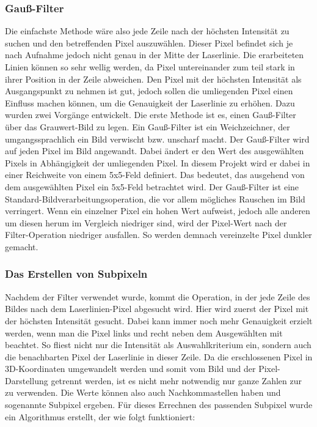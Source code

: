 	\subsubsection{Gauß-Filter}
	Die einfachste Methode wäre also jede Zeile nach der höchsten Intensität zu suchen und den betreffenden Pixel auszuwählen. Dieser Pixel befindet sich je nach Aufnahme jedoch nicht genau in der Mitte der Laserlinie. Die erarbeiteten Linien können so sehr \glqq wellig\grqq{} werden, da Pixel untereinander zum teil stark in ihrer Position in der Zeile abweichen. Den Pixel mit der höchsten Intensität als Ausgangspunkt zu nehmen ist gut, jedoch sollen die umliegenden Pixel einen Einfluss machen können, um die Genauigkeit der Laserlinie zu erhöhen. Dazu wurden zwei Vorgänge entwickelt. \newline
	Die erste Methode ist es, einen Gauß-Filter über das Grauwert-Bild zu legen. Ein Gauß-Filter ist ein Weichzeichner, der umgangssprachlich ein Bild verwischt bzw. unscharf macht. Der Gauß-Filter wird auf jeden Pixel im Bild angewandt. Dabei ändert er den Wert des ausgewählten Pixels in Abhängigkeit der umliegenden Pixel. In diesem Projekt wird er dabei in einer Reichweite von einem 5x5-Feld definiert. Das bedeutet, das ausgehend von dem ausgewählten Pixel ein 5x5-Feld betrachtet wird. Der Gauß-Filter ist eine Standard-Bildverarbeitungsoperation, die vor allem mögliches Rauschen im Bild verringert. Wenn ein einzelner Pixel ein hohen Wert aufweist, jedoch alle anderen um diesen herum im Vergleich niedriger sind, wird der Pixel-Wert nach der Filter-Operation niedriger ausfallen. So werden demnach vereinzelte Pixel dunkler gemacht.
	
	\subsubsection{Das Erstellen von Subpixeln}
	Nachdem der Filter verwendet wurde, kommt die Operation, in der jede Zeile des Bildes nach dem Laserlinien-Pixel abgesucht wird. Hier wird zuerst der Pixel mit der höchsten Intensität gesucht. Dabei kann immer noch mehr  Genauigkeit erzielt werden, wenn man die Pixel links und recht neben dem Ausgewählten mit beachtet. So fliest nicht nur die Intensität als Auswahlkriterium ein, sondern auch die benachbarten Pixel der Laserlinie in dieser Zeile. Da die erschlossenen Pixel in 3D-Koordinaten umgewandelt werden und somit vom Bild und der Pixel-Darstellung getrennt werden, ist es nicht mehr notwendig nur ganze Zahlen zur zu verwenden. Die Werte können also auch Nachkommastellen haben und sogenannte Subpixel ergeben. Für dieses Errechnen des passenden Subpixel wurde ein Algorithmus erstellt, der wie folgt funktioniert:
	
